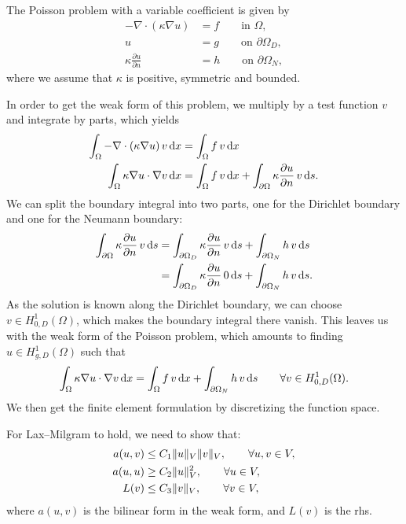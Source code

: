 The Poisson problem with a variable coefficient is given by
\begin{equation}
    \begin{split}
        -\nabla \cdot \left( \kappa \nabla u\right) &= f \qquad \text{in } \Omega,\\
        u &= g \qquad \text{on } \partial\Omega_D, \\
        \kappa \frac{\partial u}{\partial n} &= h \qquad \text{on } \partial\Omega_N,
    \end{split}
\end{equation}
where we assume that $\kappa$ is positive, symmetric and bounded.

In order to get the weak form of this problem, we multiply by a test function $v$ and integrate by parts, which yields
\begin{align*}
    \int_\Omega -\nabla \cdot \left( \kappa \nabla u \right) v \mathop{}\!\mathrm{d} x
    &= \int_\Omega f \, v \mathop{}\!\mathrm{d} x \\
    \int_\Omega \kappa \nabla u \cdot \nabla v \mathop{}\!\mathrm{d} x &= \int_{\Omega} f \, v \mathop{}\!\mathrm{d} x + \int_{\partial\Omega} \kappa \frac{\partial u}{\partial n} \, v \mathop{}\!\mathrm{d} s.
\end{align*}
We can split the boundary integral into two parts, one for the Dirichlet boundary and one for the Neumann boundary:
\begin{align*}
    \int_{\partial\Omega} \kappa \frac{\partial u}{\partial n} \, v \mathop{}\!\mathrm{d} s
    &= \int_{\partial\Omega_D}  \kappa \frac{\partial u}{\partial n} \, v \mathop{}\!\mathrm{d} s + \int_{\partial\Omega_N} h \, v \mathop{}\!\mathrm{d} s \\
    &= \int_{\partial\Omega_D} \kappa \frac{\partial u}{\partial n} \, 0 \mathop{}\!\mathrm{d} s + \int_{\partial\Omega_N} h \, v \mathop{}\!\mathrm{d} s.
\end{align*}
As the solution is known along the Dirichlet boundary, we can choose $v \in H^1_{0,D}(\Omega)$, which makes the boundary integral there vanish.
This leaves us with the weak form of the Poisson problem, which amounts to finding $u \in H_{g, D}^1(\Omega)$ such that
\begin{equation}
    \int_{\Omega} \kappa \nabla u \cdot \nabla v \mathop{}\!\mathrm{d} x = \int_{\Omega} f \, v \mathop{}\!\mathrm{d} x + \int_{\partial\Omega_N} h \, v \mathop{}\!\mathrm{d} s
    \qquad \forall v \in H^1_{0,D}(\Omega).
\end{equation}
We then get the finite element formulation by discretizing the function space.

For Lax--Milgram to hold, we need to show that: %
\begin{align}
    a(u, v) &\leq C_1 \lVert u\rVert_V \lVert v\rVert_V, \qquad \forall u, v \in V, \\
    a(u, u) &\geq C_2 \lVert u\rVert_V^2, \qquad \forall u \in V, \\
    L(v) &\leq C_3 \lVert v\rVert_V, \qquad \forall v \in V,
\end{align}
where $a(u, v)$ is the bilinear form in the weak form, and $L(v)$ is the rhs.

